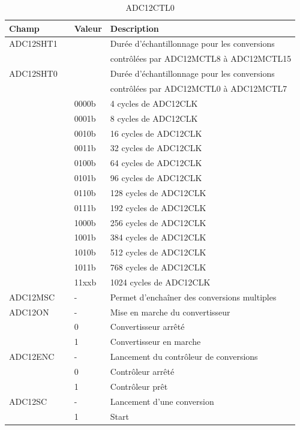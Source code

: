 \begin{table}[H]
\centering 
\begin{tabular}{l l l l}
\hline\hline
Champ & & Valeur & Description \\ %
\hline
ADC12SHT1 & & & Durée d'échantillonnage pour les conversions \\
& & & contrôlées par ADC12MCTL8 à ADC12MCTL15   \\
\hline
ADC12SHT0 & & & Durée d'échantillonnage pour les conversions \\
& & &  contrôlées par ADC12MCTL0 à ADC12MCTL7   \\
& & 0000b & 4 cycles de ADC12CLK \\
& & 0001b & 8 cycles de ADC12CLK \\
& & 0010b & 16 cycles de ADC12CLK \\
& & 0011b & 32 cycles de ADC12CLK \\
& & 0100b & 64 cycles de ADC12CLK \\
& & 0101b & 96 cycles de ADC12CLK \\
& & 0110b & 128 cycles de ADC12CLK \\
& & 0111b & 192 cycles de ADC12CLK \\
& & 1000b & 256 cycles de ADC12CLK \\
& & 1001b & 384 cycles de ADC12CLK \\
& & 1010b & 512 cycles de ADC12CLK \\
& & 1011b & 768 cycles de ADC12CLK \\
& & 11xxb & 1024 cycles de ADC12CLK \\
\hline
ADC12MSC & & - & Permet d'enchaîner des conversions multiples \\
\hline
ADC12ON & & - & Mise en marche du convertisseur \\
& & 0 & Convertisseur arrêté \\
& & 1 & Convertisseur en marche \\
\hline
ADC12ENC & & - & Lancement du contrôleur de conversions \\
& & 0 & Contrôleur arrêté \\
& & 1 & Contrôleur prêt \\
\hline
ADC12SC & & - & Lancement d'une conversion \\
& & 1 & Start \\
\hline
\end{tabular}
\caption{ADC12CTL0}
\label{table:ADC12CTL0}
\end{table}

